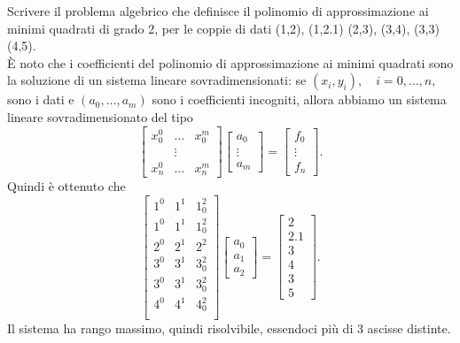 \begin{example}
	Scrivere il problema algebrico che definisce il polinomio di approssimazione ai minimi quadrati di grado 2, per le coppie di dati (1,2), (1,2.1) (2,3), (3,4), (3,3) (4,5).\\
	È noto che i coefficienti del polinomio di approssimazione ai minimi quadrati sono la soluzione di un sistema lineare sovradimensionati: se $(x_i,y_i),\quad i=0,\hdots,n,$ sono i dati e $(a_0, \hdots, a_m)$ sono i coefficienti incogniti, allora abbiamo un sistema lineare sovradimensionato del tipo
	\begin{equation*}
		\begin{bmatrix}
			x_0^0&\hdots &x_0^m\\
			&\vdots&\\
			x_n^0& \hdots &x_n^m
		\end{bmatrix}
		\begin{bmatrix}
			a_0\\
			\vdots\\
			a_m
		\end{bmatrix} =
		\begin{bmatrix}
			f_0\\
			\vdots\\
			f_n
		\end{bmatrix}.
	\end{equation*}
	Quindi è ottenuto che
	\begin{equation*}
		\begin{bmatrix}
			1^0& 1^1 &1_0^2\\
			1^0& 1^1 &1_0^2\\
			2^0& 2^1 & 2^2\\
			3^0& 3^1 & 3_0^2\\
			3^0& 3^1 & 3_0^2\\
			4^0& 4^1 & 4_0^2\\
		\end{bmatrix}
		\begin{bmatrix}
			a_0\\
			a_1\\
			a_2
		\end{bmatrix} =
		\begin{bmatrix}
			2\\
			2.1\\
			3\\
			4\\
			3\\
			5
		\end{bmatrix}.
	\end{equation*}
	Il sistema ha rango massimo, quindi risolvibile, essendoci più di 3 ascisse distinte.
\end{example}

